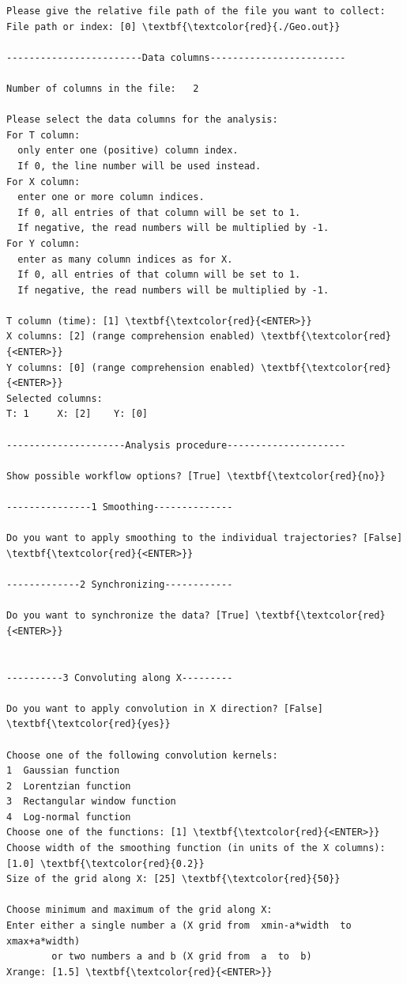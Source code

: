 \documentclass[a4paper,11pt,DIV=15,openany]{scrbook}
\begin{document}
\begin{oframed}
\begin{Verbatim}[commandchars=\\\{\}]
Please give the relative file path of the file you want to collect:
File path or index: [0] \textbf{\textcolor{red}{./Geo.out}}

------------------------Data columns------------------------

Number of columns in the file:   2

Please select the data columns for the analysis:
For T column: 
  only enter one (positive) column index. 
  If 0, the line number will be used instead.
For X column: 
  enter one or more column indices. 
  If 0, all entries of that column will be set to 1. 
  If negative, the read numbers will be multiplied by -1.
For Y column: 
  enter as many column indices as for X. 
  If 0, all entries of that column will be set to 1. 
  If negative, the read numbers will be multiplied by -1.

T column (time): [1] \textbf{\textcolor{red}{<ENTER>}}
X columns: [2] (range comprehension enabled) \textbf{\textcolor{red}{<ENTER>}}
Y columns: [0] (range comprehension enabled) \textbf{\textcolor{red}{<ENTER>}}
Selected columns:
T: 1     X: [2]    Y: [0]

---------------------Analysis procedure---------------------

Show possible workflow options? [True] \textbf{\textcolor{red}{no}}

---------------1 Smoothing--------------

Do you want to apply smoothing to the individual trajectories? [False] \textbf{\textcolor{red}{<ENTER>}}

-------------2 Synchronizing------------

Do you want to synchronize the data? [True] \textbf{\textcolor{red}{<ENTER>}}


----------3 Convoluting along X---------

Do you want to apply convolution in X direction? [False] \textbf{\textcolor{red}{yes}}

Choose one of the following convolution kernels:
1  Gaussian function
2  Lorentzian function
3  Rectangular window function
4  Log-normal function
Choose one of the functions: [1] \textbf{\textcolor{red}{<ENTER>}}
Choose width of the smoothing function (in units of the X columns): [1.0] \textbf{\textcolor{red}{0.2}}
Size of the grid along X: [25] \textbf{\textcolor{red}{50}}

Choose minimum and maximum of the grid along X:
Enter either a single number a (X grid from  xmin-a*width  to  xmax+a*width)
        or two numbers a and b (X grid from  a  to  b)
Xrange: [1.5] \textbf{\textcolor{red}{<ENTER>}}


\end{Verbatim}
\end{oframed}
\end{document}
